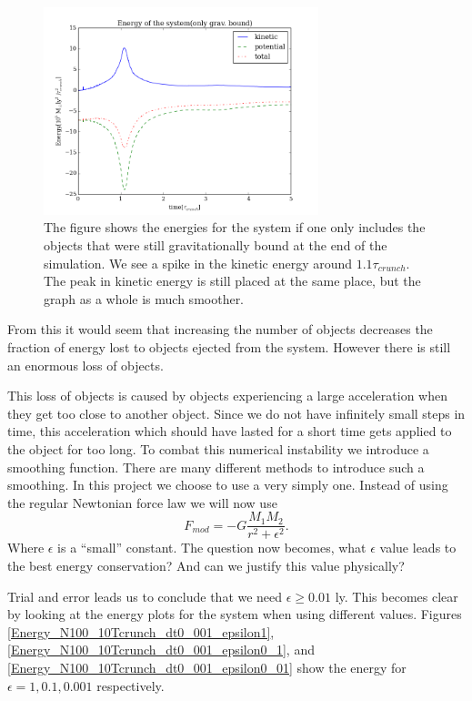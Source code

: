 \documentclass{aa}   %
\begin{document}
\begin{figure}[hbtp]
 \centering
 \includegraphics[width=80mm]{energy6.png}
 \caption[]{\label{energy6}
   The figure shows the energies for the system if one only includes the objects that were still gravitationally bound at the end of the simulation. We see a spike in the kinetic energy around $1.1\tau_{crunch}$. The peak in kinetic energy is still placed at the same place, but the graph as a whole is much smoother.
 }
\end{figure}
From this it would seem that increasing the number of objects decreases the fraction of energy lost to objects ejected from the system. However there is still an enormous loss of objects.

This loss of objects is caused by objects experiencing a large acceleration when they get too close to another object. Since we do not have infinitely small steps in time, this acceleration which should have lasted for a short time gets applied to the object for too long. To combat this numerical instability we introduce a smoothing function. There are many different methods  to introduce such a smoothing. In this project we choose to use a very simply one. Instead of using the regular Newtonian force law we will now use 
\begin{equation}
 F_{mod} = -G\frac{M_1 M_2}{r^2+\epsilon^2}.
\end{equation}
Where $\epsilon$ is a ``small'' constant.
The question now becomes, what $\epsilon$ value leads to the best energy conservation? And can we justify this value physically?

Trial and error leads us to conclude that we need $\epsilon \ge 0.01$ ly. This becomes clear by looking at the energy plots for the system when using different values. Figures \ref{Energy_N100_10Tcrunch_dt0_001_epsilon1}, \ref{Energy_N100_10Tcrunch_dt0_001_epsilon0_1}, and \ref{Energy_N100_10Tcrunch_dt0_001_epsilon0_01} show the energy for $\epsilon = 1, 0.1, 0.001$ respectively. 
\end{document}
